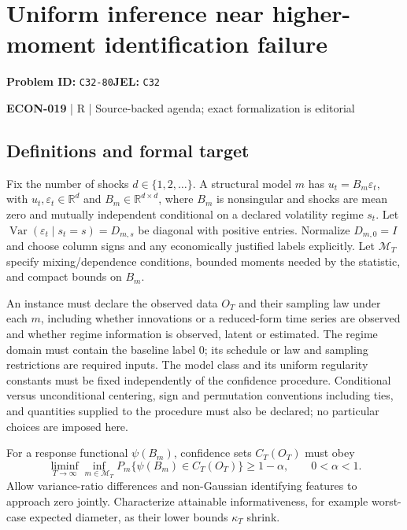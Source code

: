 \documentclass[11pt,a4paper]{article}
\newcommand{\R}{\mathbb R}
\begin{document}
\section*{Uniform inference near higher-moment identification failure}
\textbf{Problem ID:} \texttt{C32-80}\quad \textbf{JEL:} \texttt{C32}\par
\label{problem:OP-0603}


\label{audited:ECON-019}

{\sffamily\small\color{muted}\textbf{ECON-019} | R | Source-backed agenda; exact formalization is editorial\par}

\subsection*{Definitions and formal target}

Fix the number of shocks $d\in\{1,2,\ldots\}$. A structural model $m$ has $u_t=B_m\varepsilon_t$, with $u_t,\varepsilon_t\in\R^d$ and $B_m\in\R^{d\times d}$, where $B_m$ is nonsingular and shocks are mean zero and mutually independent conditional on a declared volatility regime $s_t$. Let $\operatorname{Var}(\varepsilon_t\mid s_t=s)=D_{m,s}$ be diagonal with positive entries. Normalize $D_{m,0}=I$ and choose column signs and any economically justified labels explicitly. Let $\mathcal M_T$ specify mixing/dependence conditions, bounded moments needed by the statistic, and compact bounds on $B_m$.

An instance must declare the observed data $O_T$ and their sampling law under each $m$, including whether innovations or a reduced-form time series are observed and whether regime information is observed, latent or estimated. The regime domain must contain the baseline label $0$; its schedule or law and sampling restrictions are required inputs. The model class and its uniform regularity constants must be fixed independently of the confidence procedure. Conditional versus unconditional centering, sign and permutation conventions including ties, and quantities supplied to the procedure must also be declared; no particular choices are imposed here.

For a response functional $\psi(B_m)$, confidence sets $C_T(O_T)$ must obey
\[
\liminf_{T\to\infty}\inf_{m\in\mathcal M_T}
 P_m\{\psi(B_m)\in C_T(O_T)\}\geq1-\alpha,
\qquad 0<\alpha<1.
\]
Allow variance-ratio differences and non-Gaussian identifying features to approach zero jointly. Characterize attainable informativeness, for example worst-case expected diameter, as their lower bounds $\kappa_T$ shrink.
\end{document}
